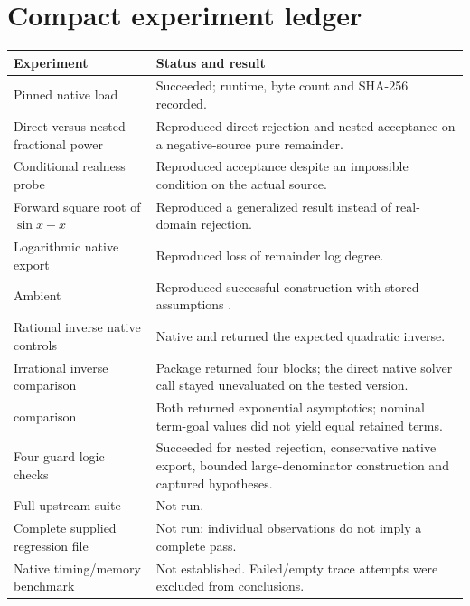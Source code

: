 \documentclass[11pt,a4paper]{article}
\newcommand{\code}[1]{\texttt{\detokenize{#1}}}
\begin{document}
\section{Compact experiment ledger}
\begin{longtable}{@{}p{}p{}@{}}
\toprule
Experiment & Status and result\\\midrule\endhead
Pinned native load & Succeeded; runtime, byte count and SHA-256 recorded.\\
Direct versus nested fractional power & Reproduced direct rejection and nested acceptance on a negative-source pure remainder.\\
Conditional realness probe & Reproduced acceptance despite an impossible condition on the actual source.\\
Forward square root of $\sin x-x$ & Reproduced a generalized result instead of real-domain rejection.\\
Logarithmic native export & Reproduced loss of remainder log degree.\\
Ambient \code{Assuming} & Reproduced successful construction with stored assumptions \code{True}.\\
Rational inverse native controls & Native \code{InverseSeries} and \code{AsymptoticSolve} returned the expected quadratic inverse.\\
Irrational inverse comparison & Package returned four blocks; the direct native solver call stayed unevaluated on the tested version.\\
\code{Erfc} comparison & Both returned exponential asymptotics; nominal term-goal values did not yield equal retained terms.\\
Four guard logic checks & Succeeded for nested rejection, conservative native export, bounded large-denominator construction and captured hypotheses.\\
Full upstream suite & Not run.\\
Complete supplied regression file & Not run; individual observations do not imply a complete pass.\\
Native timing/memory benchmark & Not established. Failed/empty trace attempts were excluded from conclusions.\\
\bottomrule
\end{longtable}
\end{document}
